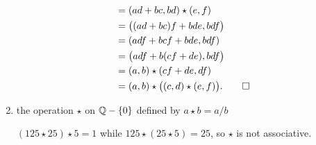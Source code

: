 \begin{enumerate}
\begin{solution}
\begin{align*}
      &= (ad + bc, bd)\star(e,f) \\
      &= \big((ad+bc)f+bde, bdf\big) \\
      &= (adf+bcf+bde, bdf) \\
      &= \big(adf+b(cf+de), bdf\big) \\
      &= (a,b)\star(cf+de,df) \\
      &= (a,b)\star\big((c,d)\star(e,f)\big). \qedhere
    \end{align*}
  \end{solution}
\item the operation $\star$ on $\mathbb{Q} - \{0\}$ defined by
  $a\star b = a/b$
  \begin{solution}
    $(125\star25)\star5 = 1$ while $125\star(25\star5) = 25$, so
    $\star$ is not associative.
  \end{solution}
\end{enumerate}


